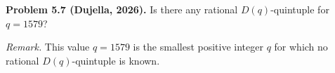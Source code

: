 \textbf{Problem 5.7 (Dujella, 2026).} Is there any rational $D(q)$-quintuple for $q=1579$?

\medskip

\textit{Remark.} This value $q=1579$ is the smallest positive integer $q$ for which no rational $D(q)$-quintuple is known.
